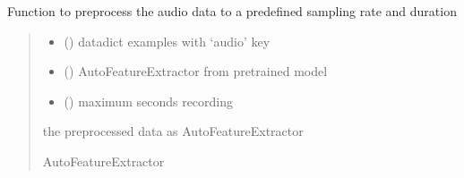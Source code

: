 \documentclass[letterpaper,10pt,english]{sphinxmanual}
\begin{document}
\begin{fulllineitems}
\label{\detokenize{auxilary_functions:auxilary_functions.preprocess_function}}
\pysigstartsignatures
{}
\pysigstopsignatures
\sphinxAtStartPar
Function to preprocess the audio data to a predefined sampling rate and duration
\begin{quote}\begin{description}
\begin{itemize}
\item {} 
\sphinxAtStartPar
{} () \textendash{} datadict examples with ‘audio’ key

\item {} 
\sphinxAtStartPar
{} () \textendash{} AutoFeatureExtractor from pretrained model

\item {} 
\sphinxAtStartPar
{} () \textendash{} maximum seconds recording

\end{itemize}

\sphinxAtStartPar
the preprocessed data as AutoFeatureExtractor

\sphinxAtStartPar
AutoFeatureExtractor

\end{description}\end{quote}

\end{fulllineitems}

\end{document}
